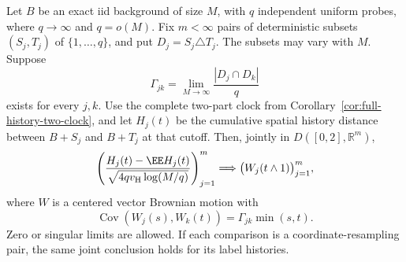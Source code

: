 \documentclass[11pt,letterpaper]{article}
\begin{document}
\begin{theorem}
\label{thm:joint-growing-history}
Let $B$ be an exact iid background of size $M$, with $q$ independent
uniform probes, where $q\to\infty$ and $q=o(M)$.
Fix $m<\infty$ pairs of deterministic subsets
$(S_j,T_j)$ of $\{1,\ldots,q\}$, and put $D_j=S_j\triangle T_j$.
The subsets may vary with $M$. Suppose
\begin{equation}\label{eq:joint-edit-overlap-matrix}
 \Gamma_{jk}=\lim_{M\to\infty}\frac{|D_j\cap D_k|}{q}
\end{equation}
exists for every $j,k$.
Use the complete two-part clock from
Corollary~\ref{cor:full-history-two-clock}, and let $H_j(t)$
be the cumulative spatial history distance between
$B+S_j$ and $B+T_j$ at that cutoff.
Then, jointly in $D([0,2],\mathbb R^m)$,
\begin{equation}\label{eq:joint-growing-history}
 \left(\frac{H_j(t)-\EE H_j(t)}
                  {\sqrt{4qv_{\rm H}\log(M/q)}}\right)_{j=1}^m
       \Longrightarrow \bigl(W_j(t\wedge1)\bigr)_{j=1}^m,
\end{equation}
where $W$ is a centered vector Brownian motion with
\[
 \operatorname{Cov}(W_j(s),W_k(t))=\Gamma_{jk}\min(s,t).
\]
Zero or singular limits are allowed. If each comparison is
a coordinate-resampling pair, the same joint conclusion holds
for its label histories.
\end{theorem}
\end{document}
